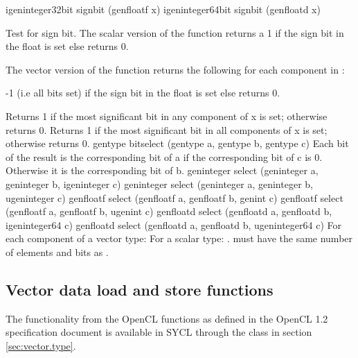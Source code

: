 \addRowTwoSL
{igeninteger32bit signbit (genfloatf x)}
{igeninteger64bit signbit (genfloatd x)}
{
Test for sign bit. The scalar version of the
function returns a 1 if the sign bit in the float is set
else returns 0.

The vector version of the function
returns the following for each component in :

-1 (i.e all bits set) if the sign bit in the float is set
else returns 0.
}

{
Returns 1 if the most significant bit in any
component of x is set; otherwise returns 0.
}
{
Returns 1 if the most significant bit in all
components of x is set; otherwise returns 0.
}
\addRow
{gentype bitselect (gentype a, gentype b, gentype c) }
{
Each bit of the result is the corresponding bit of a
if the corresponding bit of c is 0. Otherwise it is
the corresponding bit of b.
}
\addRowSixSL
{geninteger select (geninteger a, geninteger b, igeninteger c)}
{geninteger select (geninteger a, geninteger b, ugeninteger c)}
{genfloatf select (genfloatf a, genfloatf b, genint c)}
{genfloatf select (genfloatf a, genfloatf b, ugenint c)}
{genfloatd select (genfloatd a, genfloatd b, igeninteger64 c)}
{genfloatd select (genfloatd a, genfloatd b, ugeninteger64 c)}
{
For each component of a vector type:\newline
{}\newline
For a scalar type:\newline
{}.\newline
{} must have the same number
of elements and bits as .
}
\completeTable

\subsection{Vector data load and store functions}

The functionality from the OpenCL functions as defined in the OpenCL 1.2
specification document\cite[par. 6.12.7]{opencl12} is available in SYCL through
the  class in section \ref{sec:vector.type}.

